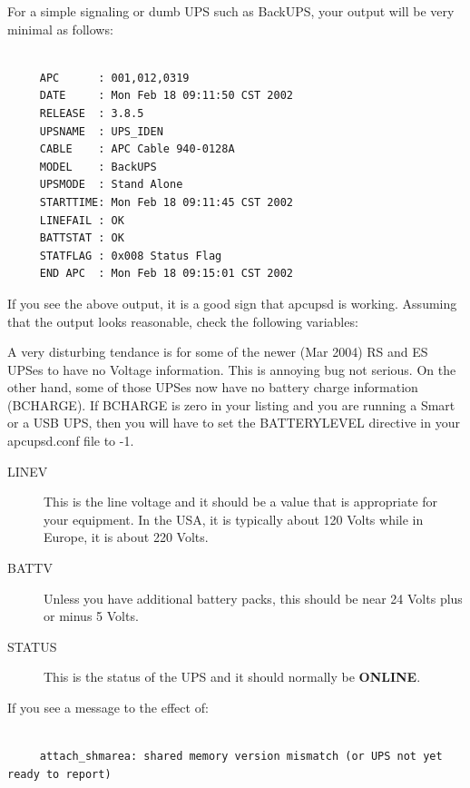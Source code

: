 {{For a simple signaling or dumb UPS such as BackUPS, your output will be very
minimal as follows: 

\footnotesize
\begin{verbatim}
     
     APC      : 001,012,0319
     DATE     : Mon Feb 18 09:11:50 CST 2002
     RELEASE  : 3.8.5
     UPSNAME  : UPS_IDEN
     CABLE    : APC Cable 940-0128A
     MODEL    : BackUPS
     UPSMODE  : Stand Alone
     STARTTIME: Mon Feb 18 09:11:45 CST 2002
     LINEFAIL : OK
     BATTSTAT : OK
     STATFLAG : 0x008 Status Flag
     END APC  : Mon Feb 18 09:15:01 CST 2002
\end{verbatim}
\normalsize

If you see the above output, it is a good sign that apcupsd is working.
Assuming that the output looks reasonable, check the following variables:  

A very disturbing tendance is for some of the newer (Mar 2004) RS and ES UPSes
to have no Voltage information.  This is annoying bug not serious.  On the
other hand, some of those UPSes now have no battery charge information
(BCHARGE).  If BCHARGE is zero in your listing and you are running a Smart or
a USB UPS, then you will have to set the BATTERYLEVEL directive in your
apcupsd.conf file to -1.  

\begin{description}

\item [LINEV]
   This is the line voltage and it should be a value that is appropriate for your
equipment. In the USA, it is typically about 120 Volts while in Europe, it is
about 220 Volts.  

\item [BATTV]
   Unless you have additional battery packs, this should be near 24 Volts plus or
minus 5 Volts.  

\item [STATUS]
   This is the status of the UPS and it should normally be {\bf ONLINE}. 
\end{description}

If you see a message to the effect of: 

\footnotesize
\begin{verbatim}
     
     attach_shmarea: shared memory version mismatch (or UPS not yet ready to report)
\end{verbatim}
\normalsize

}}
